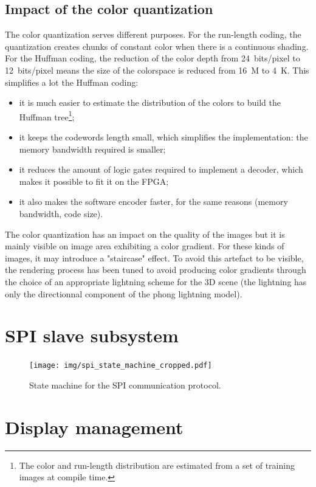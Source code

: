 \documentclass[english, DIV=13]{scrartcl}
\begin{document}
\subsection{Impact of the color quantization}

The color quantization serves different purposes. For the run-length coding,
the quantization creates chunks of constant color when there is a
continuous shading. For the Huffman
coding, the reduction of the color depth from \SI{24}{bits/pixel} to
\SI{12}{bits/pixel} means the size of the colorspace is reduced from
\SI{16}{M} to \SI{4}{K}. This simplifies a lot the Huffman coding:
\begin{itemize}
    \item it is much easier to estimate the distribution of the colors
    to build the Huffman tree\footnote{The color and run-length distribution are
    estimated from a set of training images at compile time.};
    \item it keeps the codewords length small, which simplifies the implementation:
    the memory bandwidth required is smaller;
    \item it reduces the amount of logic gates required to implement a decoder,
    which makes it possible to fit it on the FPGA;
    \item it also makes the software encoder faster, for the same reasons
    (memory bandwidth, code size).
\end{itemize}

The color quantization has an impact on the quality of the images
but it is mainly visible on image area exhibiting a color gradient.
For these kinds of images,
it may introduce a "staircase" effect. To avoid this artefact to be visible,
the rendering process has been tuned to avoid producing color gradients
through the choice of an appropriate lightning scheme for the 3D scene (the lightning
has only the directionnal component of the phong lightning model).

\section{SPI slave subsystem}
\label{sec:spi}

\begin{figure}
    \centering
    \texttt{[image: img/spi\_state\_machine\_cropped.pdf]}
    \caption{State machine for the SPI communication protocol.}
\end{figure}

\section{Display management}
\label{sec:display-mngt}
\end{document}
